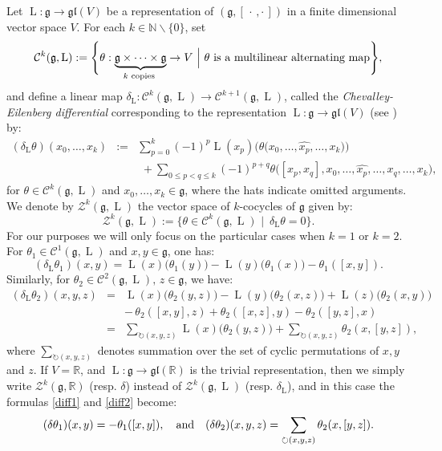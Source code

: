 \documentclass[final,1p,times,nopreprintline]{elsarticle}
\theoremstyle{definition}
\numberwithin{equation}{section}
\newcommand{\somzpk}{\displaystyle\sum_{p=0}^{k}}
\newcommand{\somzpdqk}{\displaystyle\sum_{0\leq p<q\leq k}}
\newcommand{\rel}{\mathbb{R}}
\newcommand{\nat}{\mathbb{N}}
\newcommand{\et}{\quad \textnormal{and}\quad}
\newcommand{\g}{\mathfrak{g}}
\newcommand{\LS}{\operatorname{L}}
\numberwithin{equation}{section}
\newcommand{\gl}{\mathfrak{gl}}
\newcommand{\cro}{[\,\cdot\,,\cdot\,]}
\begin{document}
Let $\LS:\g\to\gl(V)$ be a representation of $(\g,\cro)$ in a finite dimensional vector space $V$. For each $k\in\nat\backslash\{0\}$, set
\begin{equation*}
\mathcal{C}^k(\g,\LS):=\Bigg\{\theta:\underbrace{\g \times \cdots \times \g}_{k \text { copies }}\rightarrow V\,\,\Big|\,\, \theta\textnormal{ is a multilinear alternating map}\Bigg\},
\end{equation*}
and define a linear map $\delta_{\LS}:\mathcal{C}^k(\g,\LS)\rightarrow \mathcal{C}^{k+1}(\g,\LS)$, called the \textit{Chevalley-Eilenberg differential} corresponding to the representation $\LS:\g\to\gl(V)$ (see \cite[p. $195$]{HilNeb}) by:
\begin{eqnarray*}
\left(\delta_{\LS}\theta\right)(x_0,\ldots,x_{k})&:=&\somzpk(-1)^p\LS(x_p)\Big(\theta\big(x_0,\ldots,\widehat{x_p},\ldots,x_k\big)\Big)\\
&&\,\,+\somzpdqk(-1)^{p+q}\theta\big([x_p,x_q],x_0,\ldots,\widehat{x_p},\ldots,\widehat{x_q},\ldots,x_k\big),\nonumber
\end{eqnarray*}
for $\theta\in\mathcal{C}^k(\g,\LS)$ and $x_0,\ldots,x_k\in\g$, where the hats indicate omitted arguments. We denote by $\mathcal{Z}^k(\g,\LS)$ the vector space of $k$-cocycles of $\g$ given by:
\begin{equation*}
\mathcal{Z}^k(\g,\LS):=\Big\{\theta\in\mathcal{C}^k(\g,\LS)\,\,\big|\,\,\,\delta_{\LS}\theta=0\Big\}.
\end{equation*}
For our purposes we will only focus on the particular cases when $k=1$ or $k=2$. For $\theta_1\in\mathcal{C}^1(\g,\LS)$ and $x,y\in\g$, one has:
\begin{equation}\label{diff1}
\left(\delta_{\LS}\theta_1\right)(x,y)=\LS(x)\big(\theta_1(y)\big)-\LS(y)\big(\theta_1(x)\big)-\theta_1([x,y]).
\end{equation}
Similarly, for $\theta_2\in\mathcal{C}^2(\g,\LS),\,z\in\g$, we have:
\begin{eqnarray}\label{diff2}
\left(\delta_{\LS}\theta_2\right)(x,y,z)&=&\LS(x)\big(\theta_2(y,z)\big)-\LS(y)\big(\theta_2(x,z)\big)+\LS(z)\big(\theta_2(x,y)\big)\nonumber\\
&&-\,\theta_2([x,y],z)+\theta_2([x,z],y)-\theta_2([y,z],x) \nonumber\\
&=&\sum_{\circlearrowright (x,y,z)}\LS(x)\big(\theta_2(y,z)\big)+\sum_{\circlearrowright(x,y,z)}\theta_2(x,[y,z]),
\end{eqnarray}
where $\displaystyle\sum_{\circlearrowright (x,y,z)}$ denotes summation over the set of cyclic permutations of $x,y$ and $z$. If $V=\rel$, and $\LS:\g\to\gl(\rel)$ is the trivial representation, then we simply write $\mathcal{Z}^k(\g,\rel)$ (resp. $\delta$) instead of $\mathcal{Z}^k(\g,\LS)$ (resp. $\delta_{\LS}$), and in this case the formulas \eqref{diff1} and \eqref{diff2} become:
\begin{equation*}
(\delta\theta_1)(x,y)=-\theta_1([x,y]),\et (\delta\theta_2)(x,y,z)=\sum_{\circlearrowright(x,y,z)}\theta_2(x,[y,z]).
\end{equation*}
\end{document}
